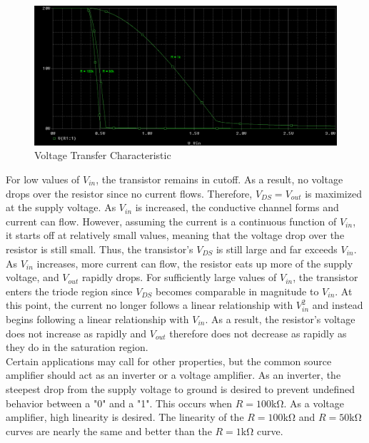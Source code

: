 \FloatBarrier

\begin{figure}[h!]
	\centering
	\includegraphics[scale=0.50]{./images/vout_vs_vin.PNG}
	\caption{Voltage Transfer Characteristic}
	\label{fig:vout_vs_vin}
\end{figure}

\FloatBarrier

For low values of $V_{in}$, the transistor remains in cutoff. As a result, no voltage drops over the resistor since no current flows. Therefore, $V_{DS} = V_{out}$ is maximized at the supply voltage. As $V_{in}$ is increased, the conductive channel forms and current can flow. However, assuming the current is a continuous function of $V_{in}$, it starts off at relatively small values, meaning that the voltage drop over the resistor is still small. Thus, the transistor's $V_{DS}$ is still large and far exceeds $V_{in}$. As $V_{in}$ increases, more current can flow, the resistor eats up more of the supply voltage, and $V_{out}$ rapidly drops. For sufficiently large values of $V_{in}$, the transistor enters the triode region since $V_{DS}$ becomes comparable in magnitude to $V_{in}$. At this point, the current no longer follows a linear relationship with $V_{in}^2$ and instead begins following a linear relationship with $V_{in}$. As a result, the resistor's voltage does not increase as rapidly and $V_{out}$ therefore does not decrease as rapidly as they do in the saturation region. \\

Certain applications may call for other properties, but the common source amplifier should act as an inverter or a voltage amplifier. As an inverter, the steepest drop from the supply voltage to ground is desired to prevent undefined behavior between a "0" and a "1". This occurs when $R = 100$\si{\kilo\ohm}. As a voltage amplifier, high linearity is desired. The linearity of the $R = 100$\si{\kilo\ohm} and $R = 50$\si{\kilo\ohm} curves are nearly the same and better than the $R = 1$\si{\kilo\ohm} curve. \\

